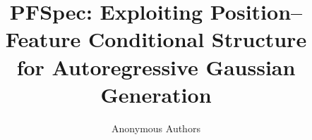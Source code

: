 \def\confName{CVPR}
\def\confYear{2027}
\title{PFSpec: Exploiting Position--Feature Conditional Structure\\for Autoregressive Gaussian Generation}
\author{Anonymous Authors}
